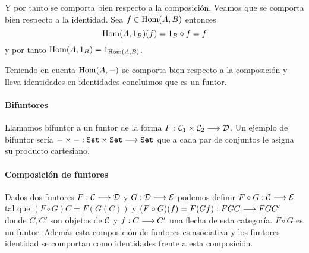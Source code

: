 Y por tanto se comporta bien respecto a la composición. Veamos que se
comporta bien respecto a la identidad. Sea $f \in \operatorname{Hom}(A, B)$ entonces
$$\operatorname{Hom}(A, 1_B)(f) = 1_B \circ f = f$$ y por tanto
$\operatorname{Hom}(A, 1_B) = 1_{\operatorname{Hom}(A, B)}$.

Teniendo en cuenta $\operatorname{Hom}(A, -)$ se comporta bien respecto a la
composición y lleva identidades en identidades concluimos que es
un funtor.

\paragraph{Bifuntores}
Llamamos bifuntor a un funtor de
la forma $F : \mathcal{C}_1\times\mathcal{C}_2\longrightarrow \mathcal{D}$. Un ejemplo de
bifuntor sería $-\times - : \texttt{Set}\times\texttt{Set}\longrightarrow \texttt{Set}$ que
a cada par de conjuntos le asigna su producto cartesiano.

\paragraph{Composición de funtores}
Dados dos funtores $F : \mathcal{C}\longrightarrow \mathcal{D}$ y $G: \mathcal{D}\longrightarrow \mathcal{E}$ podemos
definir $F \circ G : \mathcal{C}\longrightarrow \mathcal{E}$ tal que $(F\circ G)C = F(G(C))$
y $(F\circ G)(f) = F(Gf) : FGC\longrightarrow FGC'$ donde $C, C'$ son objetos
de $\mathcal{C}$ y $f: C\longrightarrow C'$ una flecha de esta categoría. $F\circ G$
es un funtor. Además esta composición de funtores es asociativa
y los funtores identidad se comportan como identidades frente
a esta composición.



